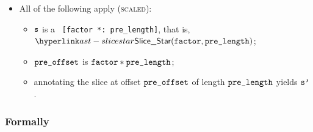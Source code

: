 \begin{itemize}
  \item All of the following apply (\textsc{scaled}):
  \begin{itemize}
    \item $\vs$ is a \scaledslice\ \texttt{[factor *: pre\_length]}, that is, \\
          $\SliceStar(\factor, \prelength)$;
    \item $\preoffset$ is $\factor * \prelength$;
    \item annotating the slice at offset $\preoffset$ of length $\prelength$ yields $\vsp$\ProseOrTypeError.
  \end{itemize}
\end{itemize}

\subsubsection{Formally}
\begin{mathpar}
\end{mathpar}

\begin{mathpar}
\end{mathpar}

\begin{mathpar}
\end{mathpar}

